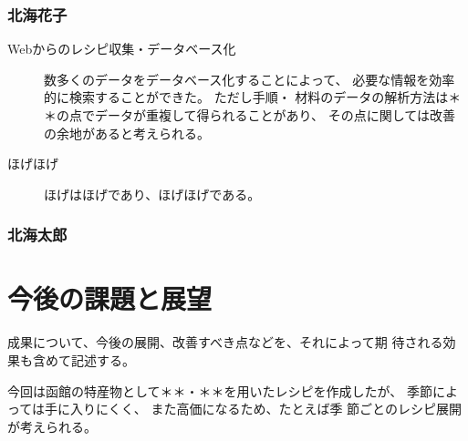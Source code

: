 \documentclass[openany,11pt,papersize]{jsbook}
\begin{document}
\subsection{北海花子}
\begin{description}
 \item[Webからのレシピ収集・データベース化] 
  数多くのデータをデータベース化することによって、
  必要な情報を効率的に検索することができた。 ただし手順・
  材料のデータの解析方法は＊＊の点でデータが重複して得られることがあり、
  その点に関しては改善の余地があると考えられる。 
 \item[ほげほげ]
  ほげはほげであり、ほげほげである。
\end{description}


\subsection{北海太郎}




\chapter{今後の課題と展望}
\begin{hissu}
成果について、今後の展開、改善すべき点などを、それによって期
待される効果も含めて記述する。
\end{hissu}

今回は函館の特産物として＊＊・＊＊を用いたレシピを作成したが、
季節によっては手に入りにくく、 また高価になるため、たとえば季
節ごとのレシピ展開が考えられる。 

\end{document}
